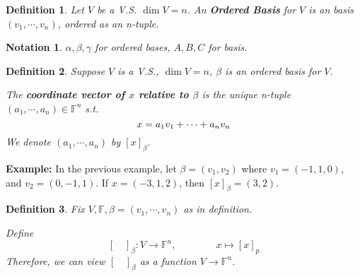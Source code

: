\documentclass[12pt]{article}
\newtheorem{definition}{Definition}[subsection]
\newtheorem{notation}{Notation}[subsection]
\newcommand{\mF}{{\mathbb{F}}}
\begin{document}
	\begin{definition}
		Let $V$ be a V.S. $\dim V = n$. An \textbf{Ordered Basis} for $V$ is an
		basis $(v_1, \cdots, v_n)$, ordered as an n-tuple. \\
	\end{definition}

	\begin{notation}
		$\alpha,\beta,\gamma$ for ordered bases, $A, B, C$ for basis. \\
	\end{notation}

	\begin{definition}
		Suppose $V$ is a V.S., $\dim V = n$, $\beta$ is an ordered basis for 
		$V$. 

		The \textbf{coordinate vector of $x$ relative to $\beta$}
		is the unique n-tuple $(a_1,\cdots, a_n) \in \mF^n$ s.t. 
		\[
			x = a_1v_1+\cdots+a_nv_n\\
		\]
		We denote $(a_1, \cdots, a_n)$ by $[x]_{\beta}$. \\
	\end{definition}

	{\color{Brown}
		\textbf{Example: }
		In the previous example, let $\beta = (v_1, v_2)$ where
		$v_1 = (-1, 1, 0)$, and $v_2 = (0, -1, 1)$. If $x = (-3, 1, 2)$, then 
		$[x]_{\beta} =(3,2)$. \\
	}

	\begin{definition}
		Fix $V, \mF, \beta = (v_1, \cdots, v_n)$ as in definition. 

		Define 
		\[
			[ \quad ]_{\beta} : V \to \mF^n, \qquad \qquad x \mapsto [x]_p
		\]
		Therefore, we can view $[\quad]_{\beta}$ as a function $V \to \mF^n$.\\
	\end{definition}
\end{document}
